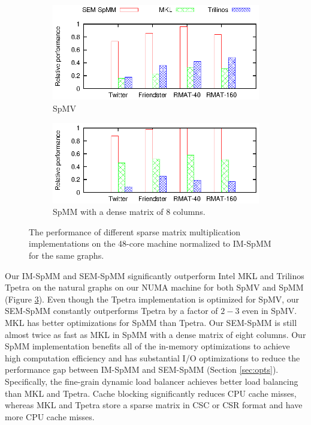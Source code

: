 \begin{figure}
	\footnotesize
	\centering
	\begin{subfigure}[b]{0.5\textwidth}
		\centering
		\includegraphics[scale=1]{SpMM_figs/SpMV-awesomer.eps}
		\vspace{-5pt}
		\caption{SpMV}
		\label{perf:spmv}
	\end{subfigure}
	\begin{subfigure}[b]{0.5\textwidth}
		\centering
		\includegraphics[scale=1]{SpMM_figs/SpMM-awesomer.eps}
		\vspace{-5pt}
		\caption{SpMM with a dense matrix of 8 columns.}
		\label{perf:spmm8}
	\end{subfigure}
	\vspace{3pt}
	\caption{The performance of different sparse matrix multiplication
		implementations on the 48-core machine normalized to IM-SpMM for
	the same graphs.}
	\label{perf:spmm}
\end{figure}

Our IM-SpMM and SEM-SpMM significantly outperform Intel MKL and
Trilinos Tpetra on the natural
graphs on our NUMA machine for both SpMV and SpMM (Figure \ref{perf:spmm}).
Even though the Tpetra implementation is optimized for SpMV, our SEM-SpMM
constantly outperforms Tpetra by a factor of $2-3$ even in SpMV. MKL has
better optimizations for SpMM than Tpetra. Our SEM-SpMM is still almost
twice as fast as MKL in SpMM with a dense matrix of eight columns. Our SpMM
implementation benefits all of the in-memory optimizations to achieve high
computation efficiency and has substantial I/O optimizations to reduce
the performance gap between IM-SpMM and SEM-SpMM (Section \ref{sec:opts}).
Specifically, the fine-grain dynamic load balancer achieves better load balancing
than MKL and Tpetra. Cache blocking significantly reduces CPU cache misses,
whereas MKL and Tpetra store a sparse matrix in CSC or CSR format and have
more CPU cache misses. %

